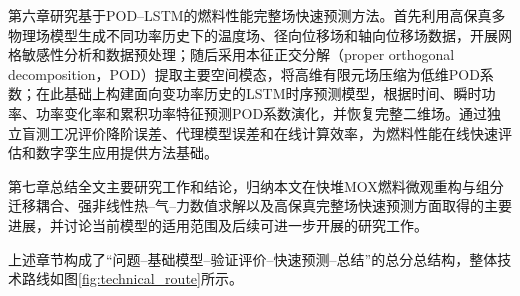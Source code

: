 第六章研究基于POD--LSTM的燃料性能完整场快速预测方法。首先利用高保真多物理场模型生成不同功率历史下的温度场、径向位移场和轴向位移场数据，开展网格敏感性分析和数据预处理；随后采用本征正交分解（proper orthogonal decomposition，POD）提取主要空间模态，将高维有限元场压缩为低维POD系数；在此基础上构建面向变功率历史的LSTM时序预测模型，根据时间、瞬时功率、功率变化率和累积功率特征预测POD系数演化，并恢复完整二维场。通过独立盲测工况评价降阶误差、代理模型误差和在线计算效率，为燃料性能在线快速评估和数字孪生应用提供方法基础。

第七章总结全文主要研究工作和结论，归纳本文在快堆MOX燃料微观重构与组分迁移耦合、强非线性热--气--力数值求解以及高保真完整场快速预测方面取得的主要进展，并讨论当前模型的适用范围及后续可进一步开展的研究工作。

上述章节构成了“问题--基础模型--验证评价--快速预测--总结”的总分总结构，整体技术路线如图\ref{fig:technical_route}所示。